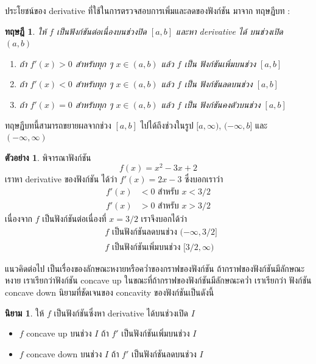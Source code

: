 \documentclass[
]{book}
\newtheorem{theorem}{ทฤษฎี}[chapter]
\theoremstyle{definition}
\newtheorem{definition}{นิยาม}[chapter]
\theoremstyle{definition}
\newtheorem{example}{ตัวอย่าง}[chapter]
\theoremstyle{definition}
\theoremstyle{definition}
\theoremstyle{remark}
\begin{document}
ประโยชน์ของ derivative ที่ใช้ในการตรวจสอบการเพิ่มและลดของฟังก์ชัน มาจาก ทฤษฏีบท :

\begin{theorem}

ให้ \(f\) เป็นฟังก์ชันต่อเนื่องบนช่วงปิด \([a,b]\) และหา derivative ได้ บนช่วงเปิด
\((a,b)\)

\begin{enumerate}
\def\labelenumi{\arabic{enumi}.}
\item
  ถ้า \(f'(x) > 0\) สำหรับทุก ๆ \(x \in (a,b)\) แล้ว \(f\) เป็น ฟังก์ชันเพิ่มบนช่วง
  \([a,b]\)
\item
  ถ้า \(f'(x) < 0\) สำหรับทุก ๆ \(x \in (a,b)\) แล้ว \(f\) เป็น ฟังก์ชันลดบนช่วง
  \([a,b]\)
\item
  ถ้า \(f'(x) = 0\) สำหรับทุก ๆ \(x \in (a,b)\) แล้ว \(f\) เป็น ฟังก์ชันคงตัวบนช่วง
  \([a,b]\)
\end{enumerate}

\end{theorem}

ทฤษฏีบทนี้สามารถขยายผลจากช่วง \([a,b]\) ไปได้ถึงช่วงในรูป \([a,\infty)\),
\((-\infty,b]\) และ \((-\infty,\infty)\)

\begin{example}
พิจารณาฟังก์ชัน \[f(x) = x^2-3x+2\] เราหา derivative ของฟังก์ชัน ได้ว่า
\(f'(x) = 2x-3\) ซึ่งบอกเราว่า \begin{equation}   \begin{aligned}
    f'(x) &< 0 \text{ สำหรับ $x < 3/2$} \\
    f'(x) &> 0 \text{ สำหรับ $x > 3/2$}
  \end{aligned} \end{equation} เนื่องจาก \(f\) เป็นฟังก์ชันต่อเนื่องที่ \(x=3/2\) เราจึงบอกได้ว่า
\begin{equation}   \begin{aligned}
    \text{ $f$ เป็นฟังก์ชันลดบนช่วง $(-\infty,3/2]$} \\
    \text{ $f$ เป็นฟังก์ชันเพิ่มบนช่วง $[3/2,\infty)$}
  \end{aligned} \end{equation}
\end{example}

แนวคิดต่อไป เป็นเรื่องของลักษณะหงายหรือคว่ำของกราฟของฟังก์ชัน
ถ้ากราฟของฟังก์ชันมีลักษณะหงาย เราเรียกว่าฟังก์ชัน concave up
ในขณะที่ถ้ากราฟของฟังก์ชันมีลักษณะคว่ำ เราเรียกว่า ฟังก์ชัน concave down นิยามที่ชัดเจนของ
concavity ของฟังก์ชันเป็นดังนี้

\begin{definition}

ให้ \(f\) เป็นฟังก์ชันซึ่งหา derivative ได้บนช่วงเปิด \(I\)

\begin{itemize}
\item
  \(f\) concave up บนช่วง \(I\) ถ้า \(f'\) เป็นฟังก์ชันเพิ่มบนช่วง \(I\)
\item
  \(f\) concave down บนช่วง \(I\) ถ้า \(f'\) เป็นฟังก์ชันลดบนช่วง \(I\)
\end{itemize}

\end{definition}
\end{document}
